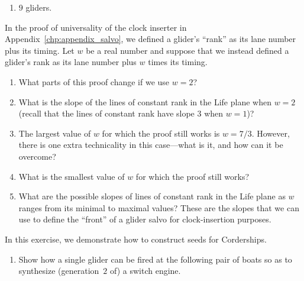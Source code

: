 \begin{multicols}{2}
\begin{problem}
\begin{enumerate}[label=\bf\color{ocre}(\alph*)]
			\item $9$ gliders.
		\end{enumerate}
	\end{problem}
	
	
	\mfilbreak
	
	
	\begin{problemstar}\label{exer:slow_salvo_clock_slope} 
		In the proof of universality of the clock inserter in Appendix~\ref{chp:appendix_salvo}, we defined a glider's ``rank'' as its lane number plus its timing. Let $w$ be a real number and suppose that we instead defined a glider's rank as its lane number plus $w$ times its timing.
		\begin{enumerate}[label=\bf\color{ocre}(\alph*)]
			\item What parts of this proof change if we use $w = 2$?
			
			\item What is the slope of the lines of constant rank in the Life plane when $w = 2$ (recall that the lines of constant rank have slope $3$ when $w = 1$)?
			
			\item The largest value of $w$ for which the proof still works is $w = 7/3$. However, there is one extra technicality in this case---what is it, and how can it be overcome?
			
			\item What is the smallest value of $w$ for which the proof still works?
			
			
			\item What are the possible slopes of lines of constant rank in the Life plane as $w$ ranges from its minimal to maximal values? These are the slopes that we can use to define the ``front'' of a glider salvo for clock-insertion purposes.
		\end{enumerate}
	\end{problemstar}
	
	
	\mfilbreak
	
	
	\begin{problemstar}\label{exer:2_engine_corder_seed}
		In this exercise, we demonstrate how to construct seeds for Corderships.\smallskip
		
		\begin{enumerate}[label=\bf\color{ocre}(\alph*)]
			\item {} Show how a single glider can be fired at the following pair of boats so as to synthesize (generation~$2$ of) a switch engine.
			\begin{center}
			\end{center}
			

\end{enumerate}
\end{problemstar}
\end{multicols}
